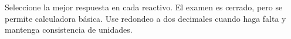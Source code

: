 \documentclass[11pt,addpoints]{exam}
\begin{document}

\begin{examinfo}
Seleccione la mejor respuesta en cada reactivo. El examen es cerrado, pero se permite calculadora básica. Use redondeo a dos decimales cuando haga falta y mantenga consistencia de unidades.
\end{examinfo}

\begin{questions}

\end{questions}
\end{document}
